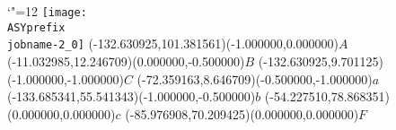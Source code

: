 \setlength{\unitlength}{1pt}%
\makeatletter%
\let\ASYencoding\f@encoding%
\let\ASYfamily\f@family%
\let\ASYseries\f@series%
\let\ASYshape\f@shape%
\makeatother%
{\catcode`"=12%
\texttt{[image: \\ASYprefix\\jobname-2\_0]}%
}%
\color{ASYcolor}%
\fontsize{12.000000}{14.400000}\selectfont%
\usefont{\ASYencoding}{\ASYfamily}{\ASYseries}{\ASYshape}%
\ASYalign(-132.630925,101.381561)(-1.000000,0.000000){$A$}%
\color{ASYcolor}%
\fontsize{12.000000}{14.400000}\selectfont%
\ASYalign(-11.032985,12.246709)(0.000000,-0.500000){$B$}%
\color{ASYcolor}%
\fontsize{12.000000}{14.400000}\selectfont%
\ASYalign(-132.630925,9.701125)(-1.000000,-1.000000){$C$}%
\color{ASYcolor}%
\fontsize{12.000000}{14.400000}\selectfont%
\ASYalign(-72.359163,8.646709)(-0.500000,-1.000000){$a$}%
\color{ASYcolor}%
\fontsize{12.000000}{14.400000}\selectfont%
\ASYalign(-133.685341,55.541343)(-1.000000,-0.500000){$b$}%
\color{ASYcolor}%
\fontsize{12.000000}{14.400000}\selectfont%
\ASYalign(-54.227510,78.868351)(0.000000,0.000000){$c$}%
\color{ASYcolor}%
\fontsize{12.000000}{14.400000}\selectfont%
\ASYalign(-85.976908,70.209425)(0.000000,0.000000){$F$}%

